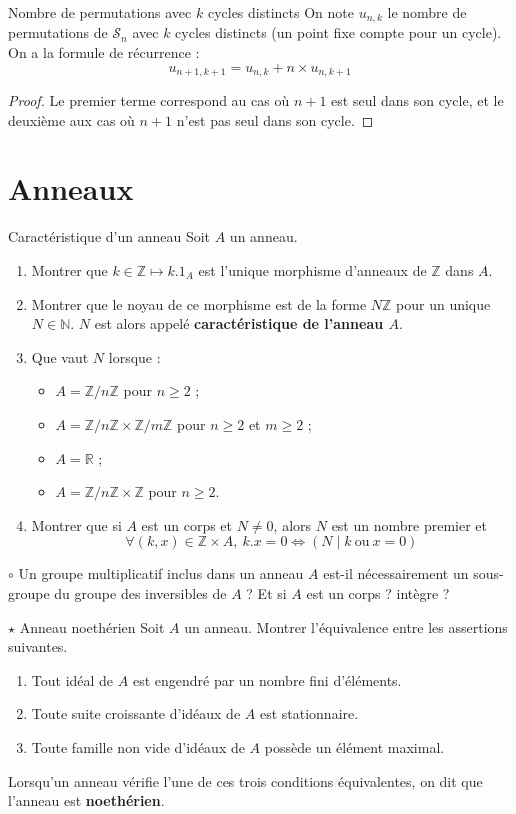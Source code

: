 \documentclass[french,a4paper]{article}
\newcommand{\N}{\mathbb{N}}
\newcommand{\Z}{\mathbb{Z}}
\newcommand{\R}{\mathbb{R}}
\theoremstyle{plain}
\theoremstyle{definition}
\theoremstyle{remark}
\begin{document}
\begin{ex}{Nombre de permutations avec $k$ cycles distincts}
	On note $u_{n,k}$ le nombre de permutations de $\mathcal{S}_n$ avec $k$ cycles distincts (un point fixe compte pour un cycle). On a la formule de récurrence : $$u_{n+1,k+1}=u_{n,k}+n\times u_{n,k+1}$$
\end{ex}

\begin{proof}
	Le premier terme correspond au cas où $n+1$ est seul dans son cycle, et le deuxième aux cas où $n+1$ n'est pas seul dans son cycle.
\end{proof}

\section{Anneaux}

\begin{ex}[Moulin.30]{Caractéristique d'un anneau}
	Soit $A$ un anneau.
	\begin{enumerate}
		\item Montrer que $k\in\Z\mapsto k.1_A$ est l'unique morphisme d'anneaux de $\Z$ dans $A$.
		\item Montrer que le noyau de ce morphisme est de la forme $N\Z$ pour un unique $N\in\N$. $N$ est alors appelé \textbf{caractéristique de l'anneau $A$}.
		\item Que vaut $N$ lorsque :
		\begin{itemize}
			\item $A=\Z/n\Z$ pour $n\geqslant 2$ ;
			\item $A=\Z/n\Z\times\Z/m\Z$ pour $n\geqslant 2$ et $m\geqslant2$ ;
			\item $A=\R$ ;
			\item $A=\Z/n\Z\times \Z$ pour $n\geqslant 2$.
		\end{itemize}
		\item Montrer que si $A$ est un corps et $N\ne 0$, alors $N$ est un nombre premier et $$\forall (k,x)\in\Z\times A,\ k.x=0\iff (N\mid k\ \text{ou}\ x=0)$$
	\end{enumerate}
\end{ex}

\begin{ex}[Moulin.31]{$\circ$}
	Un groupe multiplicatif inclus dans un anneau $A$ est-il nécessairement un sous-groupe du groupe des inversibles de $A$ ? Et si $A$ est un corps ? intègre ?
\end{ex}

\begin{ex}[Moulin.40]{$\star$ Anneau noethérien}
	Soit $A$ un anneau. Montrer l'équivalence entre les assertions suivantes.
	\begin{enumerate}
		\item Tout idéal de $A$ est engendré par un nombre fini d'éléments.
		\item Toute suite croissante d'idéaux de $A$ est stationnaire.
		\item Toute famille non vide d'idéaux de $A$ possède un élément maximal.
	\end{enumerate}
	Lorsqu'un anneau vérifie l'une de ces trois conditions équivalentes, on dit que l'anneau est \textbf{noethérien}.
\end{ex}
\end{document}

